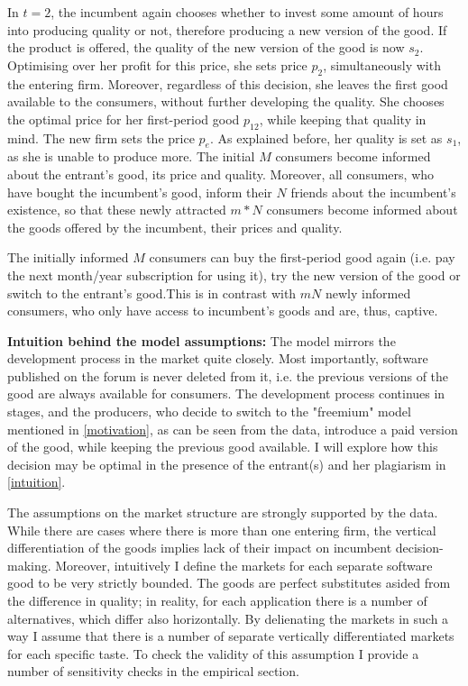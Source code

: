 \documentclass{article}
\numberwithin{figure}{section}
\numberwithin{table}{section}
\theoremstyle{indented}
\numberwithin{equation}{section} %
\begin{document}
In \textbf{$t=2$}, the incumbent again chooses whether to invest some amount of hours into producing quality or not, therefore producing a new version of the good. If the product is offered, the quality of the new version of the good is now  $s_2$. Optimising over her profit for this price, she sets price $p_2$, simultaneously with the entering firm. Moreover, regardless of this decision, she leaves the first good available to the consumers, without further developing the quality. She chooses the optimal price for her first-period good $p_{12}$, while keeping that quality in mind. The new firm sets the price $p_e$. As explained before, her quality is set as $s_1$, as she is unable to produce more. The initial $M$ consumers become informed about the entrant's good, its price and quality. Moreover, all consumers, who have bought the incumbent's good, inform their $N$ friends about the incumbent's existence, so that these newly attracted $m*N$ consumers become informed about the goods offered by the incumbent, their prices and quality.

The initially informed $M$ consumers can buy the first-period good again (i.e. pay the next month/year subscription for using it), try the new version of the good or switch to the entrant's good.This is in contrast with $mN$ newly informed consumers, who only have access to incumbent's goods and are, thus, captive.


\textbf{Intuition behind the model assumptions:} The model mirrors the development process in the market quite closely. Most importantly, software published on the forum is never deleted from it, i.e. the previous versions of the good are always available for consumers. The development process continues in stages, and the producers, who decide to switch to the "freemium" model mentioned in \ref{motivation}, as can be seen from the data, introduce a paid version of the good, while keeping the previous good available. I will explore how this decision may be optimal in the presence of the entrant(s) and her plagiarism in \ref{intuition}. 

The assumptions on the market structure are strongly supported by the data. While there are cases where there is more than one entering firm, the vertical differentiation of the goods implies lack of their impact on incumbent decision-making. Moreover, intuitively I define the markets for each separate software good to be very strictly bounded. The goods are perfect substitutes asided from the difference in quality; in reality, for each application there is a number of alternatives, which differ also horizontally. By delienating the markets in such a way I assume that there is a number of separate vertically differentiated markets for each specific taste. To check the validity of this assumption I provide a number of sensitivity checks in the empirical section.
\end{document}
